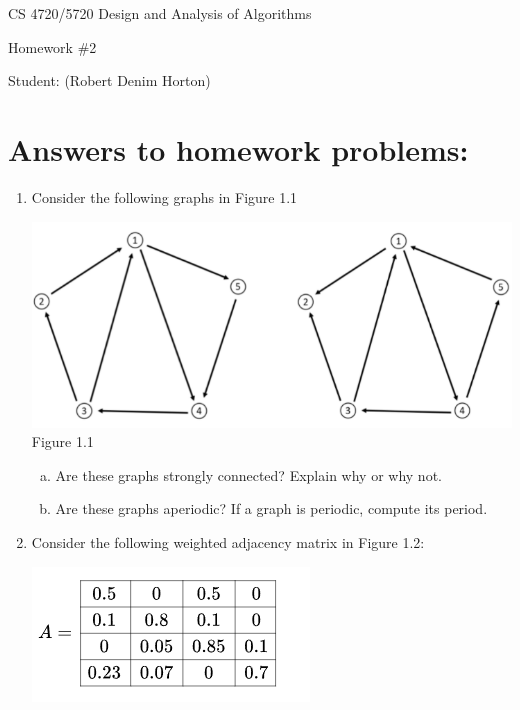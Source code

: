 \documentclass[11pt]{article}
\begin{document}
 

\rhead{\today}

\begin{center}\begin{Large}
CS 4720/5720 Design and Analysis of Algorithms

Homework \#2

Student: (Robert Denim Horton)
\end{Large}
\end{center}


\section*{Answers to homework problems:}

\begin{enumerate}
\item Consider the following graphs in Figure 1.1
\begin{center}
\includegraphics[scale=0.6]{Question1_Figure1.1}\\
Figure 1.1
\end{center}
	\begin{enumerate}[(a)]
		\item Are these graphs strongly connected? Explain why or why not.
		\item Are these graphs aperiodic? If a graph is periodic, compute its period.
	\end{enumerate}
\item Consider the following weighted adjacency matrix in Figure 1.2:
\begin{center}
\includegraphics[scale=0.6]{Question2_Figure1.2}\\

\end{center}
\end{enumerate}
\end{document}
